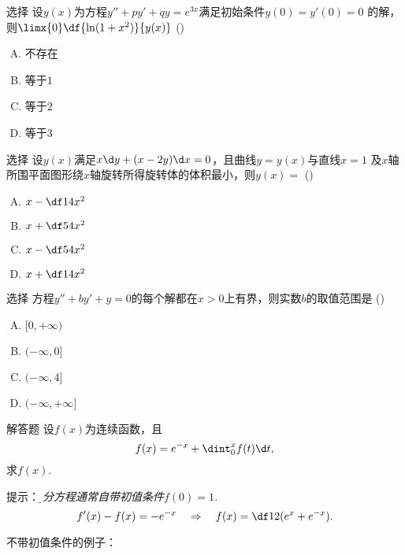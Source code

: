 \begin{frame}{选择}
	\linespread{1.3}
	\;设$y(x)$为方程$y''+py'+qy=e^{3x}$满足初始条件$y(0)=y'(0)=0$
	的解，则$\limx{0}\df{\ln(1+x^2)}{y(x)}$
	(\underline{\;})
	\begin{enumerate}[(A)]
	  \item 不存在
	  \item 等于$1$
	  \item 等于$2$
	  \item 等于$3$
	\end{enumerate}
\end{frame}

\begin{frame}{选择}
	\linespread{1.3}
	\;设$y(x)$满足$x\d y+(x-2y)\d x=0$，且曲线$y=y(x)$与直线$x=1$
	及$x$轴所围平面图形绕$x$轴旋转所得旋转体的体积最小，则$y(x)=$
	(\underline{\;})
	\begin{enumerate}[(A)]
	  \item $x-\df14x^2$
	  \item $x+\df54x^2$
	  \item $x-\df54x^2$
	  \item $x+\df14x^2$
	\end{enumerate}
\end{frame}

\begin{frame}{选择}
	\linespread{1.3}
	\;方程$y''+by'+y=0$的每个解都在$x>0$上有界，则实数$b$的取值范围是
	(\underline{\;})
	\begin{enumerate}[(A)]
	  \item $[0,+\infty)$
	  \item $(-\infty,0]$
	  \item $(-\infty,4]$
	  \item $(-\infty,+\infty]$
	\end{enumerate}
\end{frame}


\begin{frame}{解答题}
	\linespread{1.2}
	\;设$f(x)$为连续函数，且
	$$f(x)=e^{-x}+\dint_0^xf(t)\d t,$$
	求$f(x)$.
	
	\pause\alert{提示：}\it\b  积分方程通常自带初值条件$f(0)=1$.\pause
	$$f'(x)-f(x)=-e^{-x}\quad\Rightarrow\quad 
	f(x)=\df12(e^x+e^{-x}).$$
	
	\pause 不带初值条件的例子：
\end{frame}

